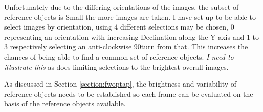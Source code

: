 Unfortunately due to the differing orientations of the images, the subset of
reference objects is Small the more images are taken. I have set up to be able
to select images by orientation, using 4 different selections may be chosen, 0
representing an orientation with increasing Declination along the Y axis and 1
to 3 respectively selecting an anti-clockwise 90\degree turn from that. This
increases the chances of being able to find a common set of reference objects.
\textit{I need to illustrate this} as does limiting selections to the brightest
overall images.

As discussed in Section \ref{section:fwoptap}, the brightness and variability of
reference objects needs to be established so each frame can be evaluated on the
basis of the reference objects available.

\clearpage